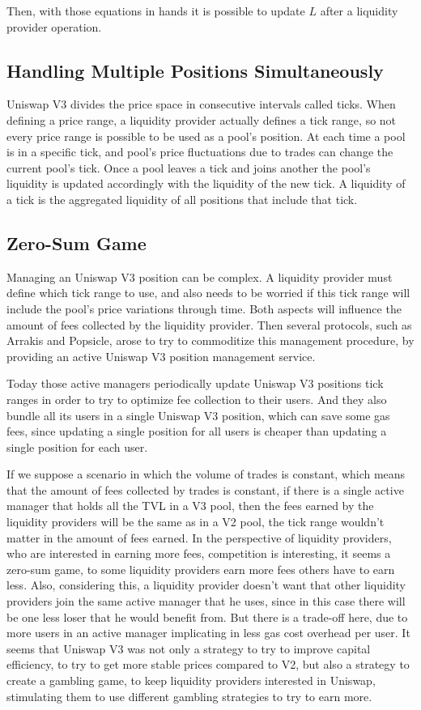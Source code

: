 \documentclass{article}
\begin{document}
Then, with those equations in hands it is possible to update $L$ after a liquidity provider operation.

\subsection{Handling Multiple Positions Simultaneously}

Uniswap V3 divides the price space in consecutive intervals called ticks.
When defining a price range, a liquidity provider actually defines a tick range, so not every price range is possible to be used as a pool's position.
At each time a pool is in a specific tick, and pool's price fluctuations due to trades can change the current pool's tick.
Once a pool leaves a tick and joins another the pool's liquidity is updated accordingly with the liquidity of the new tick.
A liquidity of a tick is the aggregated liquidity of all positions that include that tick.

\subsection{Zero-Sum Game}

Managing an Uniswap V3 position can be complex.
A liquidity provider must define which tick range to use, and also needs to be worried if this tick range will include the pool's price variations through time.
Both aspects will influence the amount of fees collected by the liquidity provider.
Then several protocols, such as Arrakis and Popsicle, arose to try to commoditize this management procedure, by providing an active Uniswap V3 position management service.

Today those active managers periodically update Uniswap V3 positions tick ranges in order to try to optimize fee collection to their users.
And they also bundle all its users in a single Uniswap V3 position, which can save some gas fees, since updating a single position for all users is cheaper than updating a single position for each user.

If we suppose a scenario in which the volume of trades is constant, which means that the amount of fees collected by trades is constant, if there is a single active manager that holds all the TVL in a V3 pool, then the fees earned by the liquidity providers will be the same as in a V2 pool, the tick range wouldn't matter in the amount of fees earned.
In the perspective of liquidity providers, who are interested in earning more fees, competition is interesting, it seems a zero-sum game, to some liquidity providers earn more fees others have to earn less.
Also, considering this, a liquidity provider doesn't want that other liquidity providers join the same active manager that he uses, since in this case there will be one less loser that he would benefit from.
But there is a trade-off here, due to more users in an active manager implicating in less gas cost overhead per user.
It seems that Uniswap V3 was not only a strategy to try to improve capital efficiency, to try to get more stable prices compared to V2, but also a strategy to create a gambling game, to keep liquidity providers interested in Uniswap, stimulating them to use different gambling strategies to try to earn more.
\end{document}
